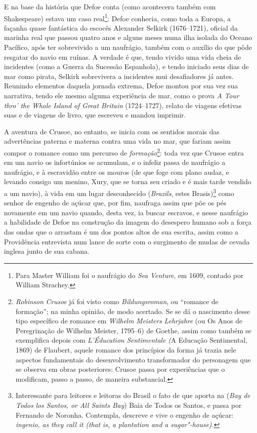 E na base da história que Defoe conta (como acontecera também com
Shakespeare) estava um caso real\footnote{Para Master William foi o
  naufrágio do \emph{Sea Venture}, em 1609, contado por William
  Strachey.}: Defoe conhecia, como toda a Europa, a façanha quase
fantástica do escocês Alexander Selkirk (1676--1721), oficial da marinha
real que passou quatro anos e alguns meses numa ilha isolada do Oceano
Pacífico, após ter sobrevivido a um naufrágio, também com o auxílio do
que pôde resgatar do navio em ruínas. A verdade é que, tendo vivido uma
vida cheia de incidentes (como a Guerra da Sucessão Espanhola), e tendo
iniciado seus dias de mar como pirata, Selkirk sobrevivera a incidentes
mui desafiadores já antes. Reunindo elementos daquela jornada extrema,
Defoe montou por sua vez sua narrativa, tendo ele mesmo alguma
experiência de mar, como o prova \emph{A Tour thro' the Whole}
\emph{Island of Great Britain} (1724--1727), relato de viagens efetivas
suas e de viagens de livro, que escreveu e mandou imprimir.

A aventura de Crusoe, no entanto, se inicia com os sentidos morais das
advertências paterna e materna contra uma vida no mar, que fariam assim
compor o romance como um percurso de \emph{formação}\footnote{\emph{Robinson
  Crusoe} já foi visto como \emph{Bildungsroman}, ou ``romance de
  formação''; na minha opinião, de modo acertado. Se se dá o nascimento
  desse tipo específico de romance em \emph{Wilhelm Meisters Lehrjahre}
  (ou Os Anos de Peregrinação de Wilhelm Meister, 1795--6) de Goethe,
  assim como também se exemplifica depois com \emph{L'Éducation
  Sentimentale (}A Educação Sentimental, 1869) de Flaubert, aquele
  romance dos princípios da forma já trazia nele aspectos fundamentais
  do desenvolvimento transformador do personagem que se observa em obras
  posteriores: Crusoe passa por experiências que o modificam, passo a
  passo, de maneira substancial.}: toda vez que Crusoe entra em um navio
os infortúnios se acumulam, e o infeliz passa de naufrágio a naufrágio,
e à escravidão entre os mouros (de que foge com plano audaz, e levando
consigo um menino, Xury, que se torna seu criado e é mais tarde vendido
a um navio), à vida em um lugar desconhecido (\emph{Brazils}, estes
Brasis)\footnote{Interessante para leitores e leitoras do Brasil o fato
  de que aporta na (\emph{Bay de Todos los Santos, or All Saints Bay})
  Baía de Todos os Santos, e passa por Fernando de Noronha. Contempla,
  descreve e vive o engenho de açúcar: \emph{ingenio, as they call it
  (that is, a plantation and a sugar"-house).}} como senhor de engenho de
açúcar que, por fim, naufraga assim que põe os pés novamente em um navio
quando, desta vez, ia buscar escravos, e nesse naufrágio a habilidade de
Defoe na construção da imagem do desespero humano sob a força das ondas
que o arrastam é um dos pontos altos de sua escrita, assim como a
Providência entrevista num lance de sorte com o surgimento de mudas de
cevada inglesa junto de sua cabana.

